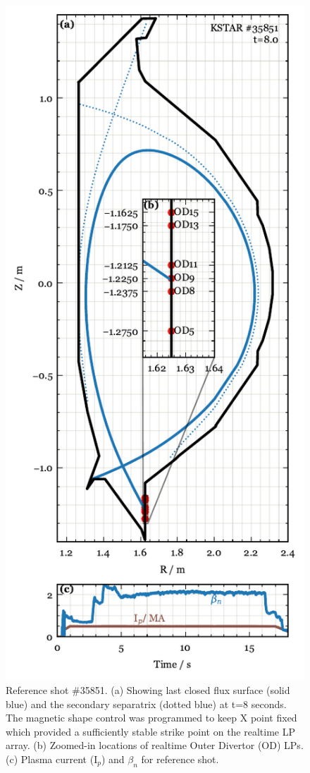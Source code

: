 \begin{figure}[!ht]
 \centering
 \includegraphics[width=\linewidth]{figures/RefShot_35851.pdf}
 \caption{
Reference shot \#35851.
(a) Showing last closed flux surface (solid blue) and the secondary separatrix (dotted blue) at t=8 seconds.
The magnetic shape control was programmed to keep X point fixed which provided a sufficiently stable strike point on the realtime \ac{LP} array.
(b) Zoomed-in locations of realtime Outer Divertor (OD) \acp{LP}.
(c) Plasma current (I$_p$) and $\beta_n$ for reference shot.
}
 \label{fig:ref_shot}
\end{figure}
